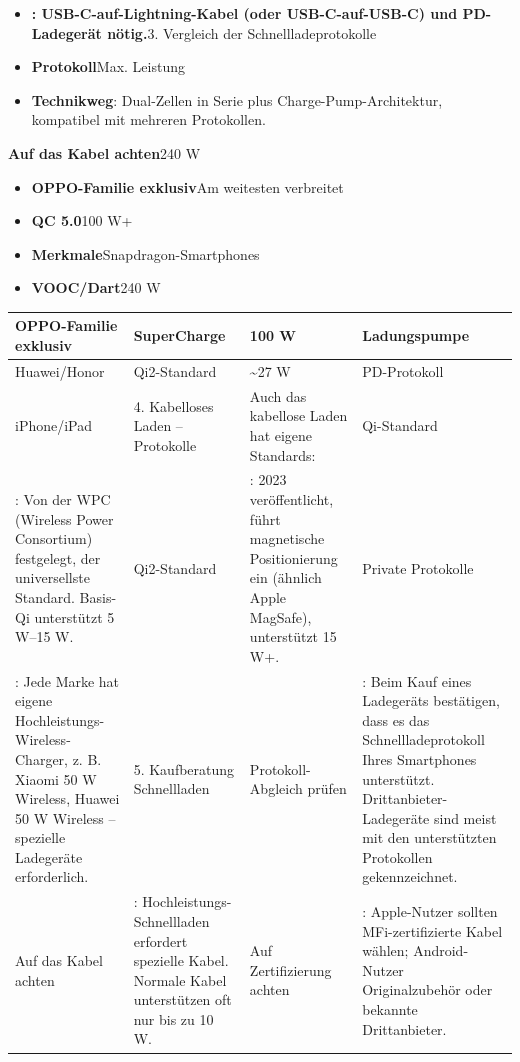 \begin{itemize}
  \item \textbf{: USB-C-auf-Lightning-Kabel (oder USB-C-auf-USB-C) und PD-Ladegerät nötig.}3. Vergleich der Schnellladeprotokolle
  \item \textbf{Protokoll}Max. Leistung
  \item \textbf{Technikweg}: Dual-Zellen in Serie plus Charge-Pump-Architektur, kompatibel mit mehreren Protokollen.
\end{itemize}

\textbf{Auf das Kabel achten}240 W

\begin{itemize}
  \item \textbf{OPPO-Familie exklusiv}Am weitesten verbreitet
  \item \textbf{QC 5.0}100 W+
  \item \textbf{Merkmale}Snapdragon-Smartphones
  \item \textbf{VOOC/Dart}240 W
\end{itemize}


\begin{center}
\begin{tabularx}{\linewidth}{|X|X|X|X|}
\hline
\textbf{OPPO-Familie exklusiv} & \textbf{SuperCharge} & \textbf{100 W} & \textbf{Ladungspumpe} \tabularnewline
\hline
Huawei/Honor & Qi2-Standard & \textasciitilde{}27 W & PD-Protokoll \tabularnewline
iPhone/iPad & 4. Kabelloses Laden – Protokolle & Auch das kabellose Laden hat eigene Standards: & Qi-Standard \tabularnewline
: Von der WPC (Wireless Power Consortium) festgelegt, der universellste Standard. Basis-Qi unterstützt 5 W–15 W. & Qi2-Standard & : 2023 veröffentlicht, führt magnetische Positionierung ein (ähnlich Apple MagSafe), unterstützt 15 W+. & Private Protokolle \tabularnewline
: Jede Marke hat eigene Hochleistungs-Wireless-Charger, z. B. Xiaomi 50 W Wireless, Huawei 50 W Wireless – spezielle Ladegeräte erforderlich. & 5. Kaufberatung Schnellladen & Protokoll-Abgleich prüfen & : Beim Kauf eines Ladegeräts bestätigen, dass es das Schnellladeprotokoll Ihres Smartphones unterstützt. Drittanbieter-Ladegeräte sind meist mit den unterstützten Protokollen gekennzeichnet. \tabularnewline
Auf das Kabel achten & : Hochleistungs-Schnellladen erfordert spezielle Kabel. Normale Kabel unterstützen oft nur bis zu 10 W. & Auf Zertifizierung achten & : Apple-Nutzer sollten MFi-zertifizierte Kabel wählen; Android-Nutzer Originalzubehör oder bekannte Drittanbieter. \tabularnewline
\hline
\end{tabularx}
\end{center}

